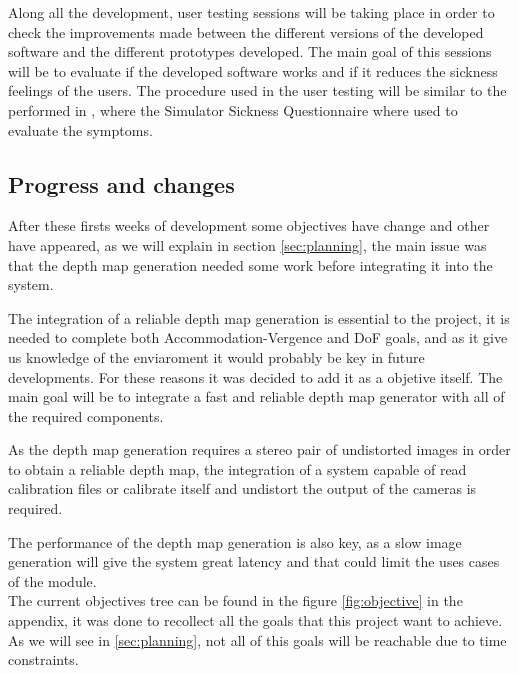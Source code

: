 \documentclass[10pt,a4paper,twocolumn,twoside]{article}
\begin{document}
	Along all the development, user testing sessions will be taking place in order to check the improvements made between the different versions of the developed software and the different prototypes developed. The main goal of this sessions will be to evaluate if the developed software works and if it reduces the sickness feelings of the users. The procedure used in the user testing will be similar to the performed in \cite{ifftConfortDoF}, where the Simulator Sickness Questionnaire \cite{ssqQuestion} where used to evaluate the symptoms. 
	
	\subsection{Progress and changes}
	
	After these firsts weeks of development some objectives have change and other have appeared, as we will explain in section \ref{sec:planning}, the main issue was that the depth map generation needed some work before integrating it into the system.
	
	The integration of a reliable depth map generation is essential to the project, it is needed to complete both Accommodation-Vergence and DoF goals, and as it give us knowledge of the enviaroment it would probably be key in future developments. For these reasons it was decided to add it as a objetive itself. The main goal will be to integrate a fast and reliable depth map generator with all of the required components.
	
	As the depth map generation requires a stereo pair of undistorted images in order to obtain a reliable depth map, the integration of a system capable of read calibration files or calibrate itself and undistort the output of the cameras is required.  

	The performance of the depth map generation is also key, as a slow image generation will give the system great latency and that could limit the uses cases of the module. \\
	

	The current objectives tree can be found in the figure \ref{fig:objective} in the appendix, it was done to recollect all the goals that this project want to achieve. As we will see in \ref{sec:planning}, not all of this goals will be reachable due to time constraints.
	
\end{document}
